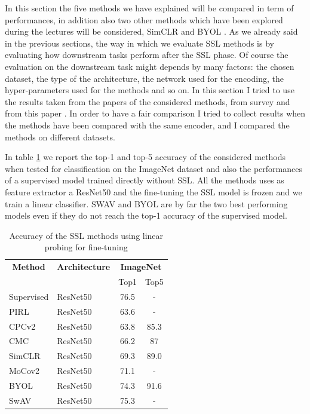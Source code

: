 In this section the five methods we have explained will be compared in term of performances, in addition also two other methods which have been explored during the lectures will be considered, SimCLR \cite{chen2020simple} and BYOL \cite{grill2020bootstrap}. As we already said in the previous sections, the way in which we evaluate SSL methods is by evaluating how downstream tasks perform after the SSL phase. Of course the evaluation on the downstream task might depends by many factors: the chosen dataset, the type of the architecture, the network used for the encoding, the hyper-parameters used for the methods and so on. In this section I tried to use the results taken from the papers of the considered methods, from survey \cite{technologies9010002} and from this paper \cite{ericsson2021well}. In order to have a fair comparison I tried to collect results when the methods have been compared with the same encoder, and I compared the methods on different datasets.

\noindent In table \ref{tab:imagenet-top1-5-acc-comp} we report the top-1 and top-5 accuracy of the considered methods when tested for classification on the ImageNet dataset and also the performances of a supervised model trained directly without SSL. All the methods uses as feature extractor a ResNet50 and the fine-tuning the SSL model is frozen and we train a linear classifier. SWAV and BYOL are by far the two best performing models even if they do not reach the top-1 accuracy of the supervised model.

\begin{table}[H]
	\centering
	\begin{tabular}{|l|l|cc|}
		\hline
		\multicolumn{1}{|c|}{\textbf{Method}} & \textbf{Architecture} & \multicolumn{2}{c|}{\textbf{ImageNet}} \\
		\multicolumn{1}{|c|}{} &  & Top1 & Top5 \\
		\hline
		Supervised & ResNet50 & 76.5 & - \\
		\hline
		PIRL & ResNet50 & 63.6 & - \\
		CPCv2 & ResNet50 & 63.8 & 85.3 \\
		CMC & ResNet50  & 66.2 & 87 \\
		SimCLR & ResNet50 & 69.3 & 89.0 \\
		MoCov2 & ResNet50 & 71.1 & - \\
		BYOL & ResNet50  & 74.3 & 91.6 \\ 
		SwAV & ResNet50 & 75.3 & - \\
		\hline
\end{tabular}
	\caption{Accuracy of the SSL methods using linear probing for fine-tuning}
	\label{tab:imagenet-top1-5-acc-comp}
\end{table}


